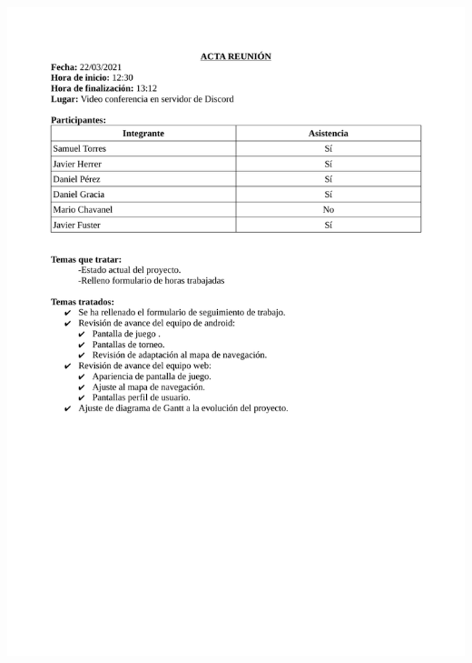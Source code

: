 \documentclass{article}
\begin{document}
\includegraphics[width=\textwidth]{../images/actas/Acta_reunion_8.pdf}
\end{document}
